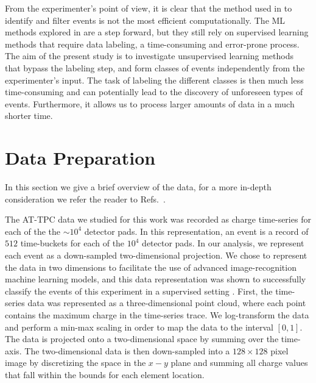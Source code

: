 \documentclass[review,sort&compress]{elsarticle}
\begin{document}
From the experimenter's point of view, it is clear that the method used in \cite{Bradt2018} to identify and filter events is not the most efficient computationally. The ML methods explored in \cite{Kuchera2019} are a step forward, but they still rely on supervised learning methods that require data labeling, a time-consuming and error-prone process. The aim of the present study is to investigate unsupervised learning methods that bypass the labeling step, and form classes of events independently from the experimenter's input. The task of labeling the different classes is then much less time-consuming and can potentially lead to the discovery of unforeseen types of events. Furthermore, it allows us to process larger amounts of data in a much shorter time. 

\section{Data Preparation}\label{sec:datadescript}

In this section we give a brief overview of the data, for a more in-depth consideration we refer the reader to Refs.~\cite{Mittig2015,Suzuki2012,Bradt2017a}. 

The AT-TPC data we studied for this work was recorded as charge time-series for each of the  the $\sim10^4$ detector pads.
In this representation, an event is a record of $512$ time-buckets for each of the $10^4$ detector pads. In our analysis, we represent each event as a down-sampled two-dimensional  projection.
We chose to represent the data in two dimensions to facilitate the use of advanced image-recognition machine learning models, and this data representation was shown to successfully classify the events of this experiment in a supervised setting \cite{Kuchera2019}.
First, the time-series data was represented as a three-dimensional  point cloud, where each point contains the maximum charge in the time-series trace. We log-transform the data and perform a min-max scaling in order to  map the data to the interval $[0, 1]$. The data is projected onto a two-dimensional  space by summing over the time-axis. The two-dimensional data is then down-sampled into a $128\times128$ pixel image by discretizing the space in the $x-y$ plane and summing all charge values that fall within the bounds for each element location.
\end{document}
